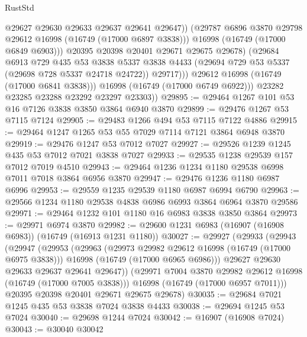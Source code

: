 \begin{lexlean}{RustStd}
\begin{coremodule}
                        @29627
                        @29630
                        @29633
                        @29637
                        @29641
                        @29647))
                    (@29787 @6896 @3870 @29798 @29612 @16998 (@16749 (@17000 @6897 @3838)))
                    @16998
                    (@16749 (@17000 @6849 @6903)))
                  @20395
                  @20398
                  @20401
                  @29671
                  @29675
                  @29678)
                (@29684
                  @6913
                  @729
                  @435
                  @53
                  @3838
                  @5337
                  @3838
                  @4433
                  (@29694 @729 @53 @5337 (@29698 @728 @5337 @24718 @24722))
                  @29717)))
            @29612
            @16998
            (@16749 (@17000 @6841 @3838)))
          @16998
          (@16749 (@17000 @6749 @6922)))
        @23282
        @23285
        @23288
        @23292
        @23297
        @23303))
@29895 := @29464 @1267 @101 @53 @16 @7126 @3838 @3850 @3864 @6940 @3870
@29899 := @29476 @1267 @53 @7115 @7124
@29905 := @29483 @1266 @494 @53 @7115 @7122 @4886
@29915 := @29464 @1247 @1265 @53 @55 @7029 @7114 @7121 @3864 @6948 @3870
@29919 := @29476 @1247 @53 @7012 @7027
@29927 := @29526 @1239 @1245 @435 @53 @7012 @7021 @3838 @7027
@29933 := @29535 @1238 @29539 @157 @7012 @7019 @4510
@29943 := @29464 @1236 @1234 @1180 @29538 @6998 @7011 @7018 @3864 @6956 @3870
@29947 := @29476 @1236 @1180 @6987 @6996
@29953 := @29559 @1235 @29539 @1180 @6987 @6994 @6790
@29963 := @29566 @1234 @1180 @29538 @4838 @6986 @6993 @3864 @6964 @3870 @29586
@29971 := @29464 @1232 @101 @1180 @16 @6983 @3838 @3850 @3864
@29973 := @29971 @6974 @3870
@29982 := @29600 @1231 @6983 (@16907 (@16908 @6983)) (@16749 (@16913 @1231 @1180))
@30027 := @29927
    (@29933
      (@29943
        (@29947
          (@29953
            (@29963
              (@29973 @29982 @29612 @16998 (@16749 (@17000 @6975 @3838)))
              @16998
              (@16749 (@17000 @6965 @6986)))
            @29627
            @29630
            @29633
            @29637
            @29641
            @29647))
        (@29971 @7004 @3870 @29982 @29612 @16998 (@16749 (@17000 @7005 @3838)))
        @16998
        (@16749 (@17000 @6957 @7011)))
      @20395
      @20398
      @20401
      @29671
      @29675
      @29678)
@30035 := @29684 @7021 @1245 @435 @53 @3838 @7024 @3838 @4433
@30038 := @29694 @1245 @53 @7024
@30040 := @29698 @1244 @7024
@30042 := @16907 (@16908 @7024)
@30043 := @30040 @30042

\end{coremodule}
\end{lexlean}
